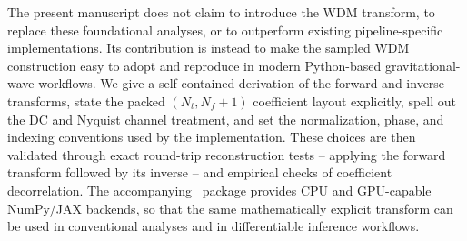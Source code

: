 \documentclass[twocolumn,preprintnumbers,
  superscriptaddress,
  nofootinbib,
  amsmath,
  amssymb,
  aps,
  prd,
  colorlinks=true,
  linkcolor=blue,
  urlcolor=blue,
  citecolor=blue,
  anchorcolor=blue
]{revtex4-2}
\begin{document}
The present manuscript does not claim to introduce the WDM transform, to replace these foundational analyses, or to outperform existing pipeline-specific implementations.  Its contribution is instead to make the sampled WDM construction easy to adopt and reproduce in modern Python-based gravitational-wave workflows.  We give a self-contained derivation of the forward and inverse transforms, state the packed $(N_t,N_f+1)$ coefficient layout explicitly, spell out the DC and Nyquist channel treatment, and set the normalization, phase, and indexing conventions used by the implementation. These choices are then validated through exact round-trip reconstruction tests -- applying the forward transform followed by its inverse -- and empirical checks of coefficient decorrelation.
The accompanying \package\ package provides CPU and GPU-capable NumPy/JAX backends, so that the same mathematically explicit transform can be used in conventional analyses and in differentiable inference workflows.
\end{document}
